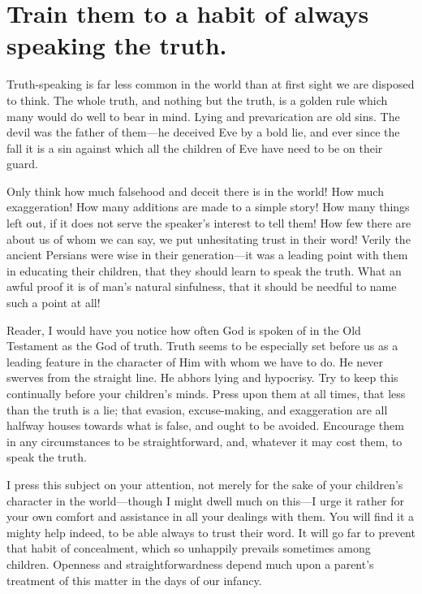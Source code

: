 \documentclass[
]{book}
\begin{document}
\hypertarget{train-them-to-a-habit-of-always-speaking-the-truth.}{%
\chapter{Train them to a habit of always speaking the truth.}\label{train-them-to-a-habit-of-always-speaking-the-truth.}}

Truth-speaking is far less common in the world than at first sight we are disposed to think. The whole truth, and nothing but the truth, is a golden rule which many would do well to bear in mind. Lying and prevarication are old sins. The devil was the father of them---he deceived Eve by a bold lie, and ever since the fall it is a sin against which all the children of Eve have need to be on their guard.

Only think how much falsehood and deceit there is in the world! How much exaggeration! How many additions are made to a simple story! How many things left out, if it does not serve the speaker's interest to tell them! How few there are about us of whom we can say, we put unhesitating trust in their word! Verily the ancient Persians were wise in their generation---it was a leading point with them in educating their children, that they should learn to speak the truth. What an awful proof it is of man's natural sinfulness, that it should be needful to name such a point at all!

Reader, I would have you notice how often God is spoken of in the Old Testament as the God of truth. Truth seems to be especially set before us as a leading feature in the character of Him with whom we have to do. He never swerves from the straight line. He abhors lying and hypocrisy. Try to keep this continually before your children's minds. Press upon them at all times, that less than the truth is a lie; that evasion, excuse-making, and exaggeration are all halfway houses towards what is false, and ought to be avoided. Encourage them in any circumstances to be straightforward, and, whatever it may cost them, to speak the truth.

I press this subject on your attention, not merely for the sake of your children's character in the world---though I might dwell much on this---I urge it rather for your own comfort and assistance in all your dealings with them. You will find it a mighty help indeed, to be able always to trust their word. It will go far to prevent that habit of concealment, which so unhappily prevails sometimes among children. Openness and straightforwardness depend much upon a parent's treatment of this matter in the days of our infancy.
\end{document}
